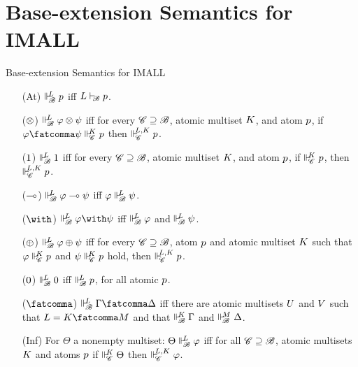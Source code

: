 \documentclass{beamer}
\begin{document}
\section{Base-extension Semantics for IMALL}
\begin{frame}{Base-extension Semantics for IMALL}
\begin{center}
\begin{itemize}
\item[(At)] $\Vdash_{ \!\!\mathscr{B} }^{ \!\!{L} } {p}$ iff ${L} \vdash_{\!\!\mathscr{B}} {p}$. 
\item[($\otimes$)] 
        $\Vdash_{ \!\!\mathscr{B} }^{ \!\!{L} } \varphi \otimes \psi$ iff for every $\mathscr{C} \supseteq \mathscr{B}$, atomic multiset ${K}$, and atom ${p}$, if $\varphi\fatcomma\psi\suppM{\baseC}{\at{K}} \at{p}$ then $\Vdash_{ \!\!\mathscr{C} }^{ \!\!{L},{K} } {p}$. 
\item[($1$)] $\Vdash_{ \!\!\mathscr{B} }^{ \!\!{L} } 1$ iff for every $\mathscr{C} \supseteq \mathscr{B}$, atomic multiset ${K}$, and atom ${p}$, if $\Vdash_{ \!\!\mathscr{C} }^{ \!\!{K} } {p}$, then $\Vdash_{ \!\!\mathscr{C} }^{ \!\!{L},{K} } {p}$. 
\item[($\multimap$)] $\Vdash_{ \!\!\mathscr{B} }^{ \!\!{L} } \varphi \multimap \psi$ iff $\varphi \Vdash_{ \!\!\mathscr{B} }^{ \!\!{L} } \psi$. 
\item[($\aand$)] $\suppM{\baseB}{\at{L}} \varphi \aand \psi$ iff $\Vdash_{ \!\!\mathscr{B} }^{ \!\!{L} } \varphi$ and $\Vdash_{ \!\!\mathscr{B} }^{ \!\!{L} } \psi$. 
\item[($\oplus$)] 
        $\Vdash_{ \!\!\mathscr{B} }^{ \!\!{L} } \varphi \oplus \psi$ iff for every $\mathscr{C} \supseteq \mathscr{B}$, atom ${p}$ and atomic multiset ${K}$ such that $\varphi \Vdash_{ \!\!\mathscr{C} }^{ \!\!{K} } {p}$ and $\psi \Vdash_{ \!\!\mathscr{C} }^{ \!\!{K} } {p}$ hold, then $\Vdash_{ \!\!\mathscr{C} }^{ \!\!{L},{K} } {p}$. 
\item[($0$)] $\Vdash_{ \!\!\mathscr{B} }^{ \!\!{L} } 0$ iff $\Vdash_{ \!\!\mathscr{B} }^{ \!\!{L} } {p}$, for all atomic ${p}$.
\item[($\fatcomma$)] $\suppM{\baseB}{\at{L}}\Gamma\fatcomma\Delta$ iff there are atomic multisets ${U}$ and ${V}$ such that $\at{L}=\at{K}\fatcomma\at{M}$ and that $\Vdash_{ \!\!\mathscr{B} }^{ \!\!{K} }\Gamma$ and $\Vdash_{ \!\!\mathscr{B} }^{ \!\!{M} }\Delta$.
\item[(Inf)] For $\Theta$ a nonempty multiset: $\Theta \Vdash_{ \!\!\mathscr{B} }^{ \!\!{L} }\varphi$ iff for all $\mathscr{C} \supseteq \mathscr{B}$, atomic multisets ${K}$ and atoms ${p}$ if $\Vdash_{ \!\!\mathscr{C} }^{ \!\!{K} }\Theta$ then $\Vdash_{ \!\!\mathscr{C} }^{ \!\!{L},{K} }\varphi$.
\end{itemize}
\end{center}
\end{frame}
\end{document}
